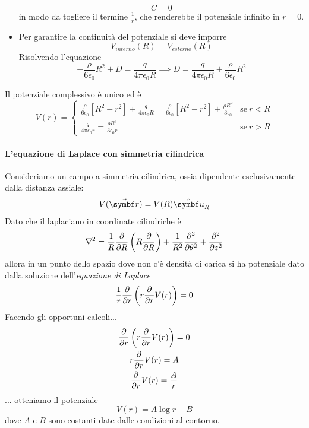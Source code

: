 \begin{examplewt}
\begin{itemize}
\begin{equation*}
			C=0
		\end{equation*}
		in modo da togliere il termine $\frac{1}{r}$, che renderebbe il potenziale infinito in $r=0$.
		\item Per garantire la continuità del potenziale si deve imporre
		\begin{equation*}
			V_{interno}(R)=V_{esterno}(R)
		\end{equation*}
			Risolvendo l'equazione
		\begin{equation*}
			-\frac{\rho}{6\epsilon_0}R^2+D=\frac{q}{4\pi\epsilon_0R}\implies D=\frac{q}{4\pi\epsilon_0R}+\frac{\rho}{6\epsilon_0}R^2
		\end{equation*}
	\end{itemize}
Il potenziale complessivo è unico ed è
\begin{equation}
	V(r)=
	\begin{cases}
		\frac{\rho}{6\epsilon_0}\left[R^2-r^2\right]+\frac{q}{4\pi\epsilon_0R}=\frac{\rho}{6\epsilon_0}\left[R^2-r^2\right]+\frac{\rho R^2}{3\epsilon_0}&\text{se}\ r< R\\
		\frac{q}{4\pi\epsilon_0r}=\frac{\rho R^3}{3\epsilon_0r}&\text{se}\ r> R
	\end{cases}
\end{equation}
\end{examplewt}
\paragraph{L'equazione di Laplace con simmetria cilindrica}
Consideriamo un campo a simmetria cilindrica, ossia dipendente esclusivamente dalla distanza assiale:
\begin{equation*}
	V(\vba{r})=V(R)\vbh{u}_R
\end{equation*}
Dato che il laplaciano in coordinate cilindriche è
\begin{equation*}
	\laplacian=\frac{1}{R}\pdv{R}\left(R\pdv{R}\right)+\frac{1}{R^2}\pdv[2]{\theta}+\pdv[2]{z}
\end{equation*}
allora in un punto dello spazio dove non c'è densità di carica si ha potenziale dato dalla soluzione dell'\textit{equazione di Laplace}
\begin{equation*}
	\frac{1}{r}\pdv{r}\left(r\pdv{r}V(r)\right)=0
\end{equation*}
Facendo gli opportuni calcoli...
\begin{gather*}
	\pdv{r}\left(r\pdv{r}V(r)\right)=0\\
	r\pdv{r}V(r)=A\\
	\pdv{r}V(r)=\frac{A}{r}\\
\end{gather*}
... otteniamo il potenziale
\begin{equation}
	V(r)=A\log{r}+B
\end{equation}
dove $A$ e $B$ sono costanti date dalle condizioni al contorno.

